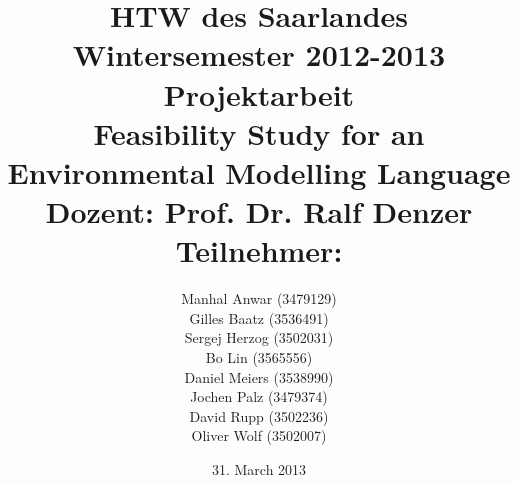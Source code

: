 


\title{%
\large HTW des Saarlandes\\
Wintersemester 2012-2013\\
Projektarbeit\\[10mm]
{\LARGE Feasibility Study for an Environmental Modelling Language}\\[10mm]
Dozent: Prof. Dr. Ralf Denzer\\[10mm]Teilnehmer:
}

\author{%
Manhal Anwar (3479129)\\[2mm]
Gilles Baatz (3536491)\\[2mm]
Sergej Herzog (3502031)\\[2mm]
Bo Lin (3565556)\\[2mm]
Daniel Meiers (3538990)\\[2mm]
Jochen Palz (3479374)\\[2mm]
David Rupp (3502236)\\[2mm]
Oliver Wolf (3502007)\\[2mm]
}

\date{31. March 2013}



\maketitle

\tableofcontents
\listoffigures


 










\printbibliography


